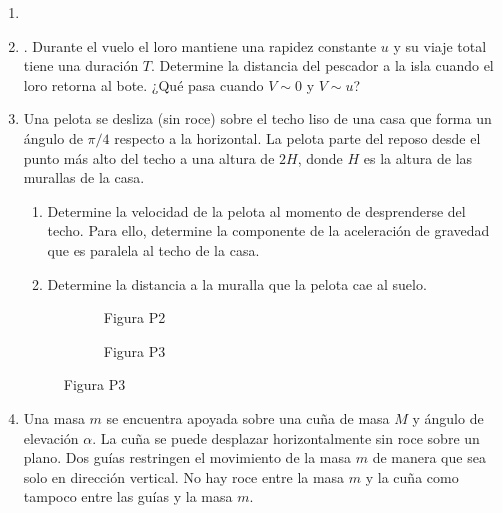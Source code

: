 \documentclass[letterpaper,11pt]{article}
\begin{document}
\vspace{-1cm}
\begin{enumerate}\setlength{\itemsep}{0.4cm}


\item[]

\item  . Durante el vuelo el loro mantiene una rapidez constante $u$ y su viaje total tiene una duración $T$. Determine la distancia del pescador a la isla cuando el loro retorna al bote. ¿Qué pasa cuando $V\sim0$ y $V\sim u$?

\begin{figure}[htbp]
  \centering
  
\end{figure}

\item Una pelota se desliza (sin roce) sobre el techo liso de una casa que forma un ángulo de $\pi/4$ respecto a la horizontal. La pelota parte del reposo desde el punto más alto del techo a una altura de $2H$, donde $H$ es la altura de las murallas de la casa.
    \begin{enumerate}
        \item Determine la velocidad de la pelota al momento de desprenderse del techo. Para ello, determine la componente de la aceleración de gravedad que es paralela al techo de la casa.
        
        \item Determine la distancia a la muralla que la pelota cae al suelo.
    \end{enumerate}

\begin{figure}[H]
    \centering
    \begin{subfigure}[t]{0.45\textwidth}
        
        \caption*{Figura P2}
    \end{subfigure}
    \hspace{0.1em}
    \begin{subfigure}[t]{0.45\textwidth}
        
        \caption*{Figura P3}
    \end{subfigure}
\end{figure}

\item Una masa $m$ se encuentra apoyada sobre una cuña de masa $M$ y ángulo de elevación $\alpha$. La cuña se puede desplazar horizontalmente sin roce sobre un plano. Dos guías restringen el movimiento de la masa $m$ de manera que sea solo en dirección vertical. No hay roce entre la masa $m$ y la cuña como tampoco entre las guías y la masa $m$.
\begin{enumerate}
    

\end{enumerate}
\end{enumerate}
\end{document}
